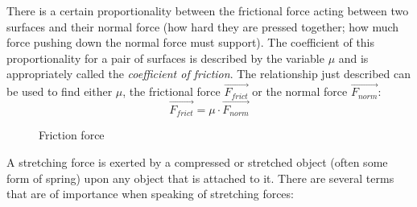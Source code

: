There is a certain proportionality between the frictional force acting between two surfaces and their normal force (how hard they are pressed together; how much force pushing down the normal force must support). The coefficient of this proportionality for a pair of surfaces is described by the variable $\mu$ and is appropriately called the \emph{coefficient of friction}. The relationship just described can be used to find either $\mu$, the frictional force $\vec{F_{frict}}$ or the normal force $\vec{F_{norm}}$: $$\vec{F_{frict}} = \mu \cdot \vec{F_{norm}}$$

\begin{figure}[h!]
	\centering
    \caption{Friction force}
\end{figure}


A stretching force is exerted by a compressed or stretched object (often some form of spring) upon any object that is attached to it. There are several terms that are of importance when speaking of stretching forces:

